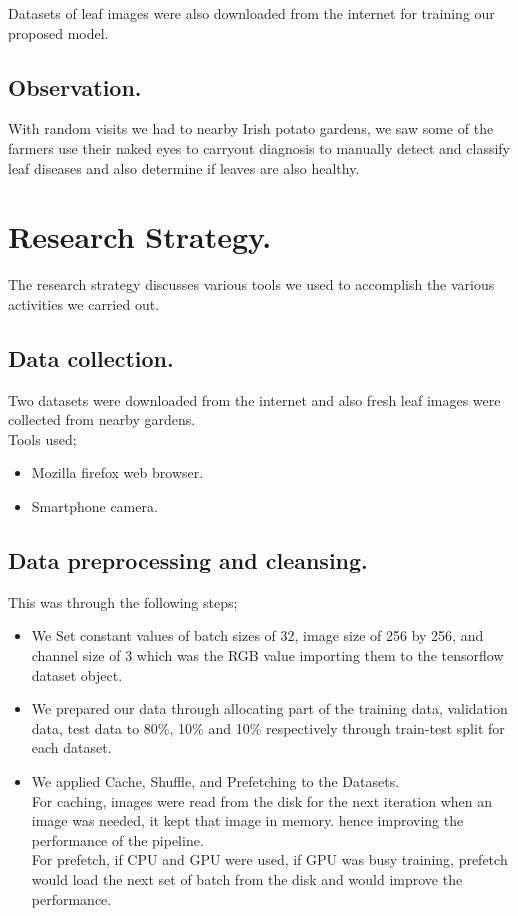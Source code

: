 \documentclass[11pt]{report}
\begin{document}
Datasets of leaf images were also downloaded from the internet for training our proposed model.\\ 

\subsection{Observation.}
With random visits we had to nearby Irish potato gardens, we saw some of the farmers use their naked eyes to carryout diagnosis to manually detect and classify leaf diseases and also determine if leaves are also healthy.\\

\section{Research Strategy.}
The research strategy discusses various tools we used to accomplish the various activities we carried out.\\

\subsection{Data collection.}
Two datasets were downloaded from the internet and also fresh leaf images were collected from nearby gardens.\\

Tools used;
\begin{itemize}
	\item Mozilla firefox web browser.
	\item Smartphone camera.
\end{itemize}

\subsection{Data preprocessing and cleansing.} 
This was through the following steps;

\begin{itemize}
	\item We Set constant values of batch sizes of 32, image size of 256 by 256, and channel size of 3 which
	was the RGB value importing them to the tensorflow dataset object.\\
	\item We prepared our data through allocating part of the training data, validation data, test data to
	80\%, 10\% and 10\% respectively through train-test split for each dataset.\\
	\item We applied Cache, Shuffle, and Prefetching to the Datasets.\\
	
	For caching, images were read from the disk for the next iteration when an image was needed,
	it kept that image in memory. hence improving the performance of the pipeline.\\
	
	For prefetch, if CPU and GPU were used, if GPU was busy training, prefetch would load the
	next set of batch from the disk and would improve the performance.\\
\end{itemize}
\end{document}
